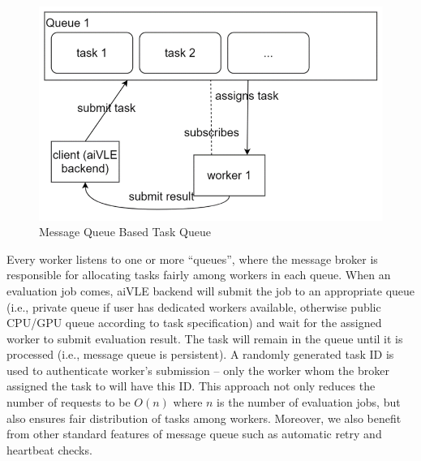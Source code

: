 \begin{figure}[H]
    \centering
    \includegraphics{images/aivle-web-mq.png}
    \caption{Message Queue Based Task Queue}
    \label{fig:aivle-web-mq}
\end{figure}

Every worker listens to one or more ``queues'', where the message broker is responsible for allocating tasks fairly among workers in each queue. When an evaluation job comes, aiVLE backend will submit the job to an appropriate queue (i.e., private queue if user has dedicated workers available, otherwise public CPU/GPU queue according to task specification) and wait for the assigned worker to submit evaluation result. The task will remain in the queue until it is processed (i.e., message queue is persistent). A randomly generated task ID is used to authenticate worker's submission – only the worker whom the broker assigned the task to will have this ID. This approach not only reduces the number of requests to be $O(n)$ where $n$ is the number of evaluation jobs, but also ensures fair distribution of tasks among workers. Moreover, we also benefit from other standard features of message queue such as automatic retry and heartbeat checks.

